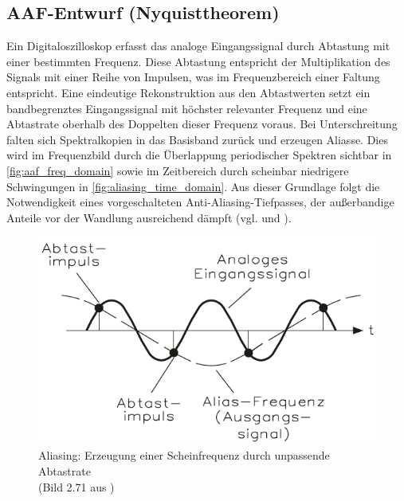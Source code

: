 \documentclass[a4paper, portrait, 12pt]{scrartcl} %
\begin{document}
\subsection{AAF-Entwurf (Nyquisttheorem)}
\label{subsec:aaf_nyquist}

Ein Digitaloszilloskop erfasst das analoge Eingangssignal durch Abtastung mit einer bestimmten Frequenz. Diese Abtastung entspricht der Multiplikation des Signals mit einer Reihe von Impulsen, was im Frequenzbereich einer Faltung entspricht. Eine eindeutige Rekonstruktion aus den Abtastwerten setzt ein bandbegrenztes Eingangssignal mit höchster relevanter Frequenz und eine Abtastrate oberhalb des Doppelten dieser Frequenz voraus. Bei Unterschreitung falten sich Spektralkopien in das Basisband zurück und erzeugen Aliasse. Dies wird im Frequenzbild durch die Überlappung periodischer Spektren sichtbar in \autoref{fig:aaf_freq_domain} sowie im Zeitbereich durch scheinbar niedrigere Schwingungen in \autoref{fig:aliasing_time_domain}. Aus dieser Grundlage folgt die Notwendigkeit eines vorgeschalteten Anti-Aliasing-Tiefpasses, der außerbandige Anteile vor der Wandlung ausreichend dämpft (vgl. \cite[S. 314-316]{Bernstein2023} und \cite[S. 151-156]{Bernstein2024}).

\begin{figure}[H]
	\centering
		\includegraphics[scale=0.5]{aliasing_time_domain_bernstein.png} 
		\caption{\centering Aliasing: Erzeugung einer Scheinfrequenz durch unpassende Abtastrate\\ (Bild 2.71 aus \cite[S. 154]{Bernstein2024})
		}
	\label{fig:aliasing_time_domain}
\end{figure}
\end{document}
